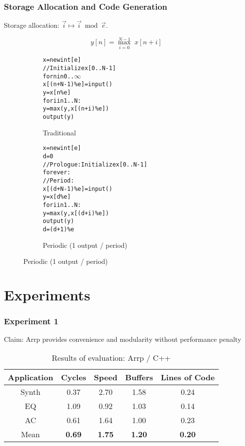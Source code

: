 \documentclass{beamer}
\begin{document}
\begin{frame}[fragile]
\frametitle{Storage Allocation and Code Generation}


Storage allocation: $\vec{i} \mapsto \vec{i} \bmod \vec{e}$.

\[y[n] = \max_{i = 0}^{N-1} \; x[n+i]\]

\vspace{-1em}
\begin{figure}
\footnotesize
\begin{subfigure}[t]{.45\linewidth}
\captionsetup{skip=0pt}
\caption{Traditional}
\begin{alltt}
x = new int[e]
// Initialize x[0..N-1]
for n in 0..\(\infty\)
  x[(n+N-1)\%e] = input()
  y = x[n\%e]
  for i in 1..N:
    y = max(y, x[(n+i)\%e])
  output(y)
\end{alltt}
\end{subfigure}
\begin{subfigure}[t]{.45\linewidth}
\captionsetup{skip=0pt}
\caption{Periodic (1 output / period)}
\begin{alltt}
x = new int[e]
d = 0
// Prologue: Initialize x[0..N-1]
forever:
  // Period:
      x[(d+N-1)\%e] = input()
      y = x[d\%e]
      for i in 1..N:
        y = max(y, x[(d+i)\%e])
      output(y)
  d = (d+1)\%e
\end{alltt}
\end{subfigure}

\end{figure}

\end{frame}




\section{Experiments}

\begin{frame}
\frametitle{Experiment 1}

Claim: Arrp provides convenience and modularity without performance penalty

\begin{table}
\centering
\begin{tabular}{c c c c c}
\hline
Application & Cycles & Speed & Buffers & Lines of Code \\
\hline
Synth & 0.37 & 2.70  & 1.58 & 0.24 \\
EQ & 1.09 & 0.92 & 1.03 & 0.14 \\
AC & 0.61 & 1.64 & 1.00 & 0.23 \\
\hline
Mean & \textbf{0.69} & \textbf{1.75} & \textbf{1.20} & \textbf{0.20}\\
\hline
\end{tabular}
\caption{Results of evaluation: Arrp / C++}
\label{tab.eval-results}
\end{table}

\end{frame}
\end{document}
